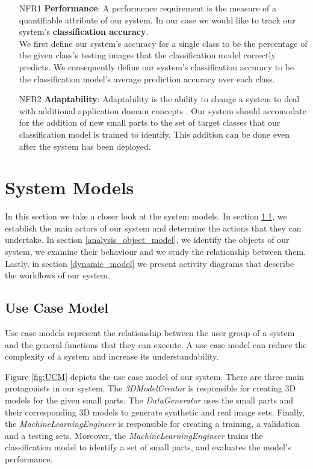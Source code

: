 \begin{itemize}
  \item [NFR1] \textbf{Performance}: A performence requirement is the measure of a quantifiable attribute of our system. In our case we would like to track our system's \textbf{classification accuracy}.
  \\We first define our system's accuracy for a single class to be the percentage of the given class's testing images that the classification model correctly predicts. We consequently define our system's classification accuracy to be the classification model's average prediction accuracy over each class.

  \item [NFR2] \textbf{Adaptability}: Adaptability is the ability to change a system to deal with additional application domain concepts \cite{bruegge2004object}. Our system should accomodate for the addition of new small parts to the set of target classes that our classification model is trained to identify. This addition can be done even after the system has been deployed.
\end{itemize}


\section{System Models}\label{system_models}

In this section we take a closer look at the system models. In section \ref{use_case_model}, we establish the main actors of our system and determine the actions that they can undertake. In section \ref{analysis_object_model}, we identify the objects of our system, we examine their behaviour and we study the relationship between them. Lastly, in section \ref{dynamic_model} we present activity diagrams that describe the workflows of our system.

\subsection{Use Case Model}\label{use_case_model}
Use case models represent the relationship between the user group of a system and the general functions that they can execute. A use case model can reduce the complexity of a system and increase its understandability.

Figure \ref{fig:UCM} depicts the use case model of our system. There are three main protagonists in our system. The \textit{3DModelCreator} is responsible for creating 3D models for the given small parts. The \textit{DataGenerator} uses the small parts and their corresponding 3D models to generate synthetic and real image sets. Finally, the \textit{MachineLearningEngineer} is responsible for creating a training, a validation and a testing sets. Moreover, the \textit{MachineLearningEngineer} trains the classification model to identify a set of small parts, and evaluates the model's performance.

